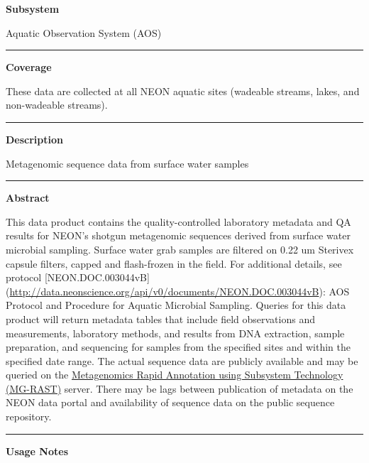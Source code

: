 \documentclass[]{article}
\begin{document}
\textbf{Subsystem}

Aquatic Observation System (AOS)

\begin{center}\rule{0.5\linewidth}{\linethickness}\end{center}

\textbf{Coverage}

These data are collected at all NEON aquatic sites (wadeable streams,
lakes, and non-wadeable streams).

\begin{center}\rule{0.5\linewidth}{\linethickness}\end{center}

\textbf{Description}

Metagenomic sequence data from surface water samples

\begin{center}\rule{0.5\linewidth}{\linethickness}\end{center}

\textbf{Abstract}

This data product contains the quality-controlled laboratory metadata
and QA results for NEON's shotgun metagenomic sequences derived from
surface water microbial sampling. Surface water grab samples are
filtered on 0.22 um Sterivex capsule filters, capped and flash-frozen in
the field. For additional details, see protocol {[}NEON.DOC.003044vB{]}
(\url{http://data.neonscience.org/api/v0/documents/NEON.DOC.003044vB}):
AOS Protocol and Procedure for Aquatic Microbial Sampling. Queries for
this data product will return metadata tables that include field
observations and measurements, laboratory methods, and results from DNA
extraction, sample preparation, and sequencing for samples from the
specified sites and within the specified date range. The actual sequence
data are publicly available and may be queried on the
\href{http://metagenomics.anl.gov/}{Metagenomics Rapid Annotation using
Subsystem Technology (MG-RAST)} server. There may be lags between
publication of metadata on the NEON data portal and availability of
sequence data on the public sequence repository.

\begin{center}\rule{0.5\linewidth}{\linethickness}\end{center}

\textbf{Usage Notes}
\end{document}
